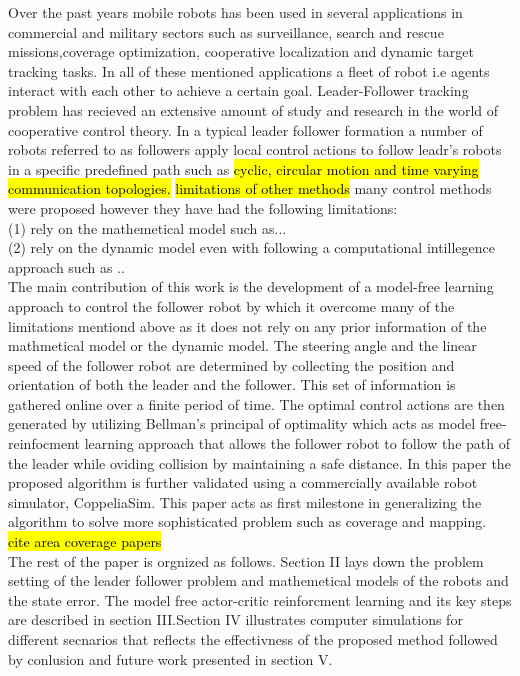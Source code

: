 \documentclass[conference]{IEEEtran}
\begin{document}
Over the past years mobile robots has been used in several applications in commercial and military sectors such as surveillance, search and rescue missions,coverage optimization, cooperative localization and dynamic target tracking tasks. In all of these mentioned applications a fleet of robot i.e agents interact with each other to achieve a certain goal. Leader-Follower tracking problem has recieved an extensive amount of study and research in the world of cooperative control theory. In a typical leader follower formation a number of robots referred to as followers apply local control actions to follow leadr's robots in a specific predefined path such as \hl {cyclic, circular motion and time varying communication topologies.} \hl {limitations of other methods} many control methods were proposed however they have had the following limitations:
\\(1) rely on the mathemetical model such as...
\\(2) rely on the dynamic model even with following a computational intillegence approach such as ..
 \\The main contribution of this work is the development of a model-free learning approach to control the follower robot by which it overcome many of the limitations mentiond above as it does not rely on any prior information of the mathmetical model or the dynamic model. The steering angle and the linear speed of the follower robot are determined by collecting the position and orientation of both the leader and the follower. This set of information is gathered online over a finite period of time. The optimal control actions are then generated by utilizing Bellman's principal of optimality which acts as model free-reinfocment learning approach that allows the follower robot to follow the path of the leader while oviding collision by maintaining a safe distance. In this paper the proposed algorithm is further validated using a commercially available robot simulator, CoppeliaSim. This paper acts as first milestone in generalizing the algorithm to solve more sophisticated problem such as coverage and mapping. \hl{cite area coverage papers}
 \\The rest of the paper is orgnized as follows. Section II lays down the problem setting of the leader follower problem and mathemetical models of the robots and the state error. The model free actor-critic reinforcment learning and its key steps are described in section III.Section IV illustrates computer simulations for different secnarios that reflects the effectivness of the proposed method followed by conlusion and future work presented in section V.      
\end{document}

